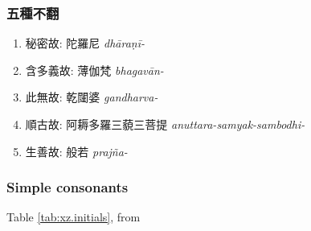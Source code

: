 \documentclass[oneside,a4paper,11pt]{article}
\newcommand{\ipa}[1]{{\phon\textit{#1}}}
\newcommand{\zh}[1]{{\cn #1}}
\newcommand{\zhc}[2]{\zh{#1} \ipa{#2}}
\begin{document}
\subsubsection{\zh{五種不翻}}

\begin{enumerate}
\item \zh{秘密故}: \zhc{陀羅尼}{dhāraṇī-}
\item \zh{含多義故}: \zhc{薄伽梵}{bhagavān-}
\item \zh{此無故}: \zhc{乾闥婆}{gandharva-}
\item \zh{順古故}: \zhc{阿耨多羅三藐三菩提}{anuttara-samyak-sambodhi-}
\item \zh{生善故}: \zhc{般若}{prajña-}
\end{enumerate}

\subsubsection{Simple consonants}
Table \ref{tab:xz.initials}, from \citet{shixd83xuanzang}
\end{document}

